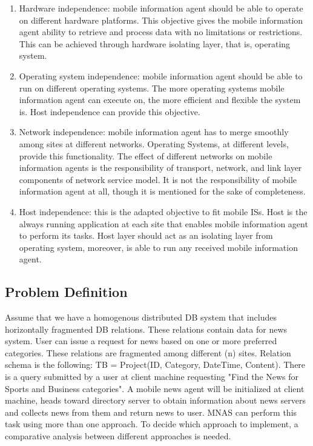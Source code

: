\documentclass[12pt,a4paper,final,twoside,onecolumn,titlepage]{book}
\begin{document}
\begin{enumerate}
\item Hardware independence: mobile information agent should be able to operate on different hardware platforms. This objective gives the mobile information agent ability to retrieve and process data with no limitations or restrictions. This can be achieved through hardware isolating layer, that is, operating system.
\item Operating system independence: mobile information agent should be able to run on different operating systems. The more operating systems mobile information agent can execute on, the more efficient and flexible the system is. Host independence can provide this objective.
\item Network independence: mobile information agent has to merge smoothly among sites at different networks. Operating Systems, at different levels, provide this functionality. The effect of different networks on mobile information agents is the responsibility of transport, network, and link layer components of network service model. It is not the responsibility of mobile information agent at all, though it is mentioned for the sake of completeness.
\item Host independence: this is the adapted objective to fit mobile \gls{IS}s. Host is the always running application at each site that enables mobile information agent to perform its tasks. Host layer should act as an isolating layer from operating system, moreover, is able to run any received mobile information agent.
\end{enumerate}

\subsection{Problem Definition}

Assume that we have a homogenous distributed \gls{DB} system that includes horizontally fragmented \gls{DB} relations. These relations contain data for news system. User can issue a request for news based on one or more preferred categories. These relations are fragmented among different (n) sites. Relation schema is the following: TB = Project(ID, Category, DateTime, Content). There is a query submitted by a user at client machine requesting "Find the News for Sports and Business categories". A mobile news agent will be initialized at client machine, heads toward directory server to obtain information about news servers and collects news from them and return news to user. \gls{MNAS} can perform this task using more than one approach. To decide which approach to implement, a comparative analysis between different approaches is needed.
\end{document}
